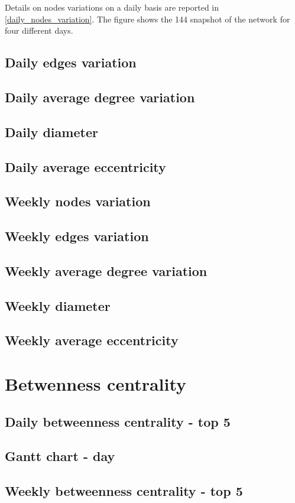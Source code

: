 	Details on nodes variations on a daily basis are reported in \ref{daily_nodes_variation}. The figure shows the 144 snapshot of the network for four different days. 
	\subsection{Daily edges variation}
	\subsection{Daily average degree variation}
	\subsection{Daily diameter}
	\subsection{Daily average eccentricity}
	\subsection{Weekly nodes variation}
	\subsection{Weekly edges variation}
	\subsection{Weekly average degree variation}
	\subsection{Weekly diameter}
	\subsection{Weekly average eccentricity}
	\section{Betwenness	 centrality}
	\subsection{Daily betweenness centrality - top 5}
	\subsection{Gantt chart - day}
	\subsection{Weekly betweenness centrality - top 5}

